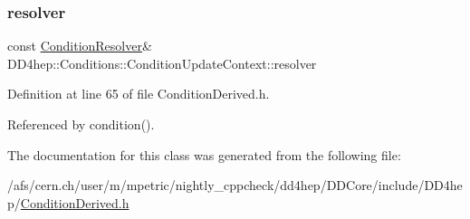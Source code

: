 \subsubsection{\texorpdfstring{resolver}{resolver}}
{\footnotesize\ttfamily const \hyperlink{class_d_d4hep_1_1_conditions_1_1_condition_resolver}{Condition\+Resolver}\& D\+D4hep\+::\+Conditions\+::\+Condition\+Update\+Context\+::resolver}



Definition at line 65 of file Condition\+Derived.\+h.



Referenced by condition().



The documentation for this class was generated from the following file\+:\begin{DoxyCompactItemize}
\item 
/afs/cern.\+ch/user/m/mpetric/nightly\+\_\+cppcheck/dd4hep/\+D\+D\+Core/include/\+D\+D4hep/\hyperlink{_condition_derived_8h}{Condition\+Derived.\+h}\end{DoxyCompactItemize}
